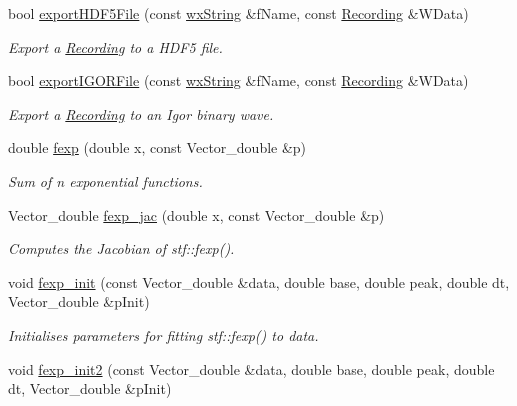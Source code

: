 \begin{DoxyCompactItemize}
bool \hyperlink{namespacestf_ab76abc79d68fcb38d37fb4ca2e16fbf1}{exportHDF5File} (const \hyperlink{classwxString}{wxString} \&fName, const \hyperlink{classRecording}{Recording} \&WData)
\begin{DoxyCompactList}\small\item\em Export a \hyperlink{classRecording}{Recording} to a HDF5 file. \item\end{DoxyCompactList}\item 
bool \hyperlink{namespacestf_a99fa117e783221a4683b8dbf2942026b}{exportIGORFile} (const \hyperlink{classwxString}{wxString} \&fName, const \hyperlink{classRecording}{Recording} \&WData)
\begin{DoxyCompactList}\small\item\em Export a \hyperlink{classRecording}{Recording} to an Igor binary wave. \item\end{DoxyCompactList}\item 
double \hyperlink{group__stfgen_gaa7e2a13c3f81aa07434ab6ba4da4a617}{fexp} (double x, const Vector\_\-double \&p)
\begin{DoxyCompactList}\small\item\em Sum of {\itshape n\/} exponential functions. \item\end{DoxyCompactList}\item 
Vector\_\-double \hyperlink{group__stfgen_ga17dd9dd4ebcdfd99370cc21505dbca94}{fexp\_\-jac} (double x, const Vector\_\-double \&p)
\begin{DoxyCompactList}\small\item\em Computes the Jacobian of stf::fexp(). \item\end{DoxyCompactList}\item 
void \hyperlink{group__stfgen_ga205a9760c992ccc914c114dcdf72eacb}{fexp\_\-init} (const Vector\_\-double \&data, double base, double peak, double dt, Vector\_\-double \&pInit)
\begin{DoxyCompactList}\small\item\em Initialises parameters for fitting stf::fexp() to {\itshape data\/}. \item\end{DoxyCompactList}\item 
void \hyperlink{group__stfgen_ga52d567f013f039416a245b985af83bbf}{fexp\_\-init2} (const Vector\_\-double \&data, double base, double peak, double dt, Vector\_\-double \&pInit)

\end{DoxyCompactItemize}
